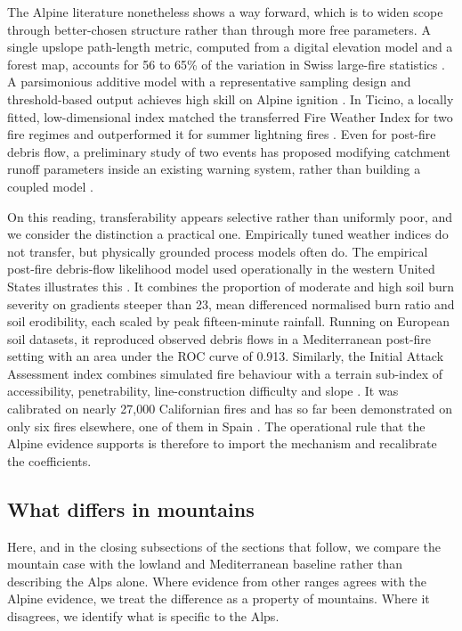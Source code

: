 \documentclass[11pt,a4paper]{article}
\begin{document}
The Alpine literature nonetheless shows a way forward, which is to widen scope through better-chosen structure rather than through more free parameters. A single upslope path-length metric, computed from a digital elevation model and a forest map, accounts for 56 to 65\% of the variation in Swiss large-fire statistics \citep{conedera_linking_2024}. A parsimonious additive model with a representative sampling design and threshold-based output achieves high skill on Alpine ignition \citep{moreno_spacetime_2025}. In Ticino, a locally fitted, low-dimensional index matched the transferred Fire Weather Index for two fire regimes and outperformed it for summer lightning fires \citep{de_angelis_modelling_2015}. Even for post-fire debris flow, a preliminary study of two events has proposed modifying catchment runoff parameters inside an existing warning system, rather than building a coupled model \citep{tiranti_wildfires_2021}.

On this reading, transferability appears selective rather than uniformly poor, and we consider the distinction a practical one. Empirically tuned weather indices do not transfer, but physically grounded process models often do. The empirical post-fire debris-flow likelihood model used operationally in the western United States illustrates this \citep{diakakis_exploring_2023}. It combines the proportion of moderate and high soil burn severity on gradients steeper than 23\degree{}, mean differenced normalised burn ratio and soil erodibility, each scaled by peak fifteen-minute rainfall. Running on European soil datasets, it reproduced observed debris flows in a Mediterranean post-fire setting with an area under the ROC curve of 0.913. Similarly, the Initial Attack Assessment index combines simulated fire behaviour with a terrain sub-index of accessibility, penetrability, line-construction difficulty and slope \citep{cardil_assessing_2025}. It was calibrated on nearly 27{,}000 Californian fires and has so far been demonstrated on only six fires elsewhere, one of them in Spain \citep{cardil_assessing_2025}. The operational rule that the Alpine evidence supports is therefore to import the mechanism and recalibrate the coefficients.

\subsection{What differs in mountains}

Here, and in the closing subsections of the sections that follow, we compare the mountain case with the lowland and Mediterranean baseline rather than describing the Alps alone. Where evidence from other ranges agrees with the Alpine evidence, we treat the difference as a property of mountains. Where it disagrees, we identify what is specific to the Alps.
\end{document}
